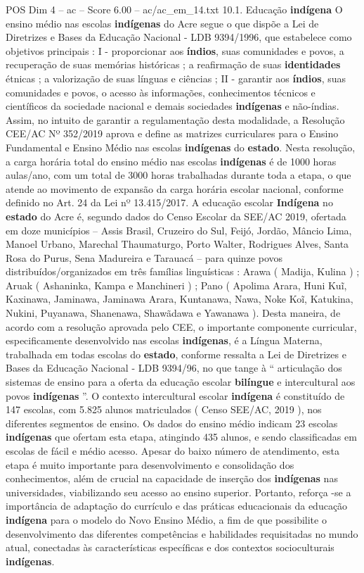 \begin{textsample}{POS Dim 4 – ac – Score 6.00 – ac/ac\_em\_14.txt}  \label{ex:f4_pos_244}
10.1.
Educação \textbf{indígena} O ensino médio nas escolas \textbf{indígenas} do Acre segue o que dispõe a Lei de Diretrizes e Bases da Educação Nacional - LDB 9394/1996, que estabelece como objetivos principais : I - proporcionar aos \textbf{índios}, suas comunidades e povos, a recuperação de suas memórias históricas ; a reafirmação de suas \textbf{identidades} étnicas ; a valorização de suas línguas e ciências ; II - garantir aos \textbf{índios}, suas comunidades e povos, o acesso às informações, conhecimentos técnicos e científicos da sociedade nacional e demais sociedades \textbf{indígenas} e não-índias.
Assim, no intuito de garantir a regulamentação desta modalidade, a Resolução CEE/AC Nº 352/2019 aprova e define as matrizes curriculares para o Ensino Fundamental e Ensino Médio nas escolas \textbf{indígenas} do \textbf{estado}.
Nesta resolução, a carga horária total do ensino médio nas escolas \textbf{indígenas} é de 1000 horas aulas/ano, com um total de 3000 horas trabalhadas durante toda a etapa, o que atende ao movimento de expansão da carga horária escolar nacional, conforme definido no Art. 24 da Lei nº 13.415/2017.
A educação escolar \textbf{Indígena} no \textbf{estado} do Acre é, segundo dados do Censo Escolar da SEE/AC 2019, ofertada em doze municípios – Assis Brasil, Cruzeiro do Sul, Feijó, Jordão, Mâncio Lima, Manoel Urbano, Marechal Thaumaturgo, Porto Walter, Rodrigues Alves, Santa Rosa do Purus, Sena Madureira e Tarauacá – para quinze povos distribuídos/organizados em três famílias linguísticas : Arawa ( Madija, Kulina ) ; Aruak ( Ashaninka, Kampa e Manchineri ) ; Pano ( Apolima Arara, Huni Kuĩ, Kaxinawa, Jaminawa, Jaminawa Arara, Kuntanawa, Nawa, Noke Koĩ, Katukina, Nukini, Puyanawa, Shanenawa, Shawãdawa e Yawanawa ).
Desta maneira, de acordo com a resolução aprovada pelo CEE, o importante componente curricular, especificamente desenvolvido nas escolas \textbf{indígenas}, é a Língua Materna, trabalhada em todas escolas do \textbf{estado}, conforme ressalta a Lei de Diretrizes e Bases da Educação Nacional - LDB 9394/96, no que tange à “ articulação dos sistemas de ensino para a oferta da educação escolar \textbf{bilíngue} e intercultural aos povos \textbf{indígenas} ”.
O contexto intercultural escolar \textbf{indígena} é constituído de 147 escolas, com 5.825 alunos matriculados ( Censo SEE/AC, 2019 ), nos diferentes segmentos de ensino.
Os dados do ensino médio indicam 23 escolas \textbf{indígenas} que ofertam esta etapa, atingindo 435 alunos, e sendo classificadas em escolas de fácil e médio acesso.
Apesar do baixo número de atendimento, esta etapa é muito importante para desenvolvimento e consolidação dos conhecimentos, além de crucial na capacidade de inserção dos \textbf{indígenas} nas universidades, viabilizando seu acesso ao ensino superior.
Portanto, reforça -se a importância de adaptação do currículo e das práticas educacionais da educação \textbf{indígena} para o modelo do Novo Ensino Médio, a fim de que possibilite o desenvolvimento das diferentes competências e habilidades requisitadas no mundo atual, conectadas às características específicas e dos contextos socioculturais \textbf{indígenas}.

\end{textsample}
